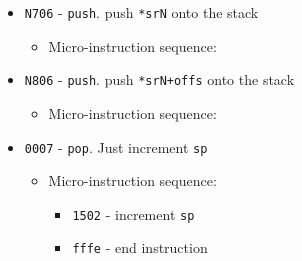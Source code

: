 \documentclass{article}
\def\specialptodata#1{\Verb|#1202| - output *\Verb|sr#1| to data bus}
\def\specialptodatao#1{\Verb|#1302| - output *(\Verb|sr#1|+\Verb|offs|) to data bus}
\def\pkptrout{\Verb|0202| - output *\Verb|pk| to data bus}
\def\sptoaddr{\Verb|1102| - output \Verb|sp| to addr bus}
\def\datatooffs{\Verb|4402| - write to \Verb|offs| from data bus}
\def\incrementsp{\Verb|1502| - increment \Verb|sp|}
\def\decrementsp{\Verb|1602| - decrement \Verb|sp|}
\def\writeRAM{\Verb|0004| - write data bus to *(addr bus)}
\def\echodatalong{\Verb|0025| - echo data bus to itself for 3 cycles}
\def\done{\Verb|fffe| - end instruction}
\begin{document}
\begin{itemize}
    \item \Verb|N706| - \Verb|push|. push \Verb|*srN| onto the stack
    \begin{itemize}
        \item Micro-instruction sequence:
    \end{itemize}

    
    \item \Verb|N806| - \Verb|push|. push \Verb|*srN+offs| onto the stack
    \begin{itemize}
        \item Micro-instruction sequence:
    \end{itemize}

    \item \Verb|0007| - \Verb|pop|. Just increment \Verb|sp|
    \begin{itemize}
        \item Micro-instruction sequence:
        \begin{itemize}
            \item \incrementsp
            \item \done
        \end{itemize}
    \end{itemize}


\end{itemize}
\end{document}
